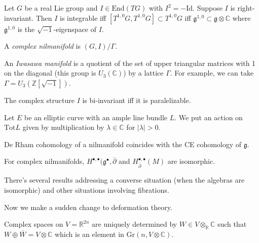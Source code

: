 \begin{theorem}[]
\label{theorem-}

\end{theorem}

\noindent
Let $G$ be a real Lie group
and $I \in \text{End}(TG)$ with
$I^2=-\text{Id}$.
Suppose $I$ is right-invariant.
Then $I$ is integrable iff
$[T^{1,0}G,T^{1,0}G]\subset T^{1,0}G$
iff
$\mathfrak{g}^{1,0}\subset\mathfrak{g}
\otimes\mathbb{C}$
where $\mathfrak{g}^{1,0}$ is the
$\sqrt{-1}$-eigenspace of $I$.

A {\it complex nilmanifold} is
$(G,I)/\Gamma$.

\begin{example}
\label{example-iwasawa-manifold}
An {\it Iwasawa manifold} is a quotient of
the set
of upper triangular matrices with 1 on the
diagonal
(this group is $U_3(\mathbb{C})$) by a
lattice $\Gamma$.
For example, we can take
$\Gamma=U_3(\mathbb{Z}[\sqrt{-1}])$.
\end{example}

\noindent
The complex structure $I$ is bi-invariant iff
it is paralelizable.

\medskip\noindent
Let $E$ be an elliptic curve with an ample
line bundle $L$.
We put an action on $\text{Tot}L$ given by
multiplication by
$\lambda \in \mathbb{C}$ for $|\lambda|>0$.

\begin{theorem}
\label{theorem-de-rham-cheva-eilen}
De Rham cohomology of a nilmanifold coincides
with the
CE cohomology of $\mathfrak{g}$.
\end{theorem}

\begin{theorem}
\label{theorem-console-fino}
For complex nilmanifolds,
$H^{\bullet,\bullet}(\mathfrak{g}^\bullet,
\overline{\partial}$
and
$H^{\bullet,\bullet}_{\overline{\partial}}(M)
$
are isomorphic.
\end{theorem}

\noindent
There's several results addressing a converse
situation
(when the algebras are isomorphic) and other
situations
involving fibrations.

\medskip\noindent
Now we make a sudden change to deformation
theory.

\begin{lemma}
\label{lemma-}
Complex spaces on $V=\mathbb{R}^{2n}$ are
uniquely determined
by $W \in V \otimes_{\mathbb{R}}\mathbb{C}$
such that $W \oplus \overline{ W}=V \otimes
\mathbb{C}$
which is an element in $\text{Gr}(n, V
\otimes \mathbb{C})$.
\end{lemma}

